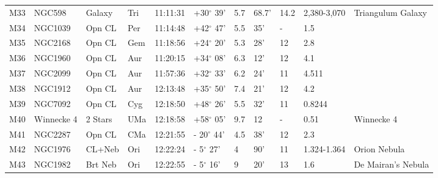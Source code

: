 \documentclass[10pt,twoside,a4paper,english]{article}
\begin{document}
\begin{longtable}{@{}lllllllllll@{}}
M33        & NGC598      & Galaxy     & Tri       & 11:11:31 & +30$^{\circ}$ 39'  & 5.7       & 68.7'                & 14.2     & 2,380-3,070         & Triangulum Galaxy                         \\ 
M34        & NGC1039     & Opn CL     & Per       & 11:14:48 & +42$^{\circ}$ 47'  & 5.5       & 35'                  & -        & 1.5                 &                                           \\ 
M35        & NGC2168     & Opn CL     & Gem       & 11:18:56 & +24$^{\circ}$ 20'  & 5.3       & 28'                  & 12       & 2.8                 &                                           \\ 
M36        & NGC1960     & Opn CL     & Aur       & 11:20:15 & +34$^{\circ}$ 08'  & 6.3       & 12'                  & 12       & 4.1                 &                                           \\ 
M37        & NGC2099     & Opn CL     & Aur       & 11:57:36 & +32$^{\circ}$ 33'  & 6.2       & 24'                  & 11       & 4.511               &                                           \\ 
M38        & NGC1912     & Opn CL     & Aur       & 12:13:48 & +35$^{\circ}$ 50'  & 7.4       & 21'                  & 12       & 4.2                 &                                           \\ 
M39        & NGC7092     & Opn CL     & Cyg       & 12:18:50 & +48$^{\circ}$ 26'  & 5.5       & 32'                  & 11       & 0.8244              &                                           \\ 
M40        & Winnecke 4  & 2 Stars    & UMa       & 12:18:58 & +58$^{\circ}$ 05'  & 9.7       & 12                   & -        & 0.51                & Winnecke 4                                \\ 
M41        & NGC2287     & Opn CL     & CMa       & 12:21:55 & - 20$^{\circ}$ 44' & 4.5       & 38'                  & 12       & 2.3                 &                                           \\ 
M42        & NGC1976     & CL+Neb     & Ori       & 12:22:24 & - 5$^{\circ}$ 27'  & 4         & 90'                  & 11       & 1.324-1.364         & Orion Nebula                              \\ 
M43        & NGC1982     & Brt Neb    & Ori       & 12:22:55 & - 5$^{\circ}$ 16'  & 9         & 20'                  & 13       & 1.6                 & De Mairan's Nebula                        \\ 

\end{longtable}
\end{document}
